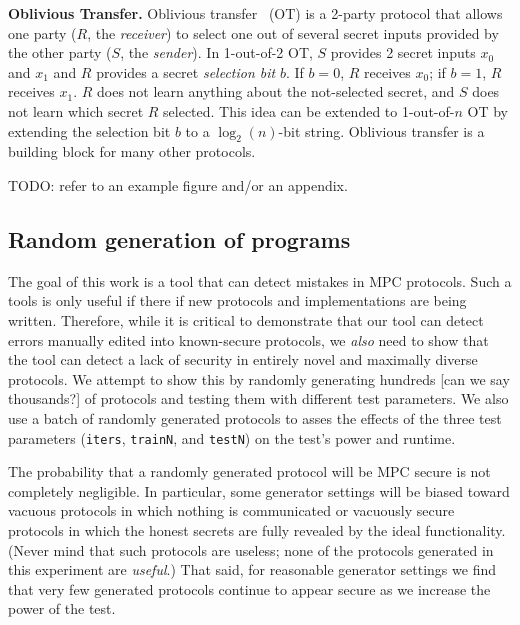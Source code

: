 \documentclass[compsoc, conference, a4paper, 10pt, times]{IEEEtran}
\renewcommand{\paragraph}[1]{\vspace*{2pt}\noindent\textbf{#1}}
\begin{document}
\paragraph{Oblivious Transfer.}
Oblivious transfer~\cite{todo} (OT) is a 2-party protocol that allows one party ($R$, the \emph{receiver}) to select one out of several secret inputs provided by the other party ($S$, the \emph{sender}). In 1-out-of-2 OT, $S$ provides 2 secret inputs $x_0$ and $x_1$ and $R$ provides a secret \emph{selection bit} $b$. If $b=0$, $R$ receives $x_0$; if $b=1$, $R$ receives $x_1$. $R$ does not learn anything about the not-selected secret, and $S$ does not learn which secret $R$ selected. This idea can be extended to 1-out-of-$n$ OT by extending the selection bit $b$ to a $\log_2(n)$-bit string.
%
Oblivious transfer is a building block for many other protocols.


TODO: refer to an example figure and/or an appendix.

\subsection{Random generation of programs}
\label{sec:random-protocols}

The goal of this work is a tool that can detect mistakes in MPC protocols.
Such a tools is only useful if there if new protocols and implementations are being written.
Therefore, while it is critical to demonstrate that our tool can detect errors manually edited into known-secure protocols,
we \textit{also} need to show that the tool can detect a lack of security in entirely novel and maximally diverse protocols.
We attempt to show this by randomly generating hundreds [can we say thousands?] of protocols and testing them with different test parameters.
We also use a batch of randomly generated protocols to asses the effects of the three test parameters
(\texttt{iters}, \texttt{trainN}, and \texttt{testN})
on the test's power and runtime.

The probability that a randomly generated protocol will be MPC secure is not completely negligible.
In particular, some generator settings will be biased toward vacuous protocols in which nothing is communicated
or vacuously secure protocols in which the honest secrets are fully revealed by the ideal functionality.
(Never mind that such protocols are useless; none of the protocols generated in this experiment are \textit{useful}.)
That said, for reasonable generator settings we find that very few generated protocols
continue to appear secure as we increase the power of the test.
\end{document}
